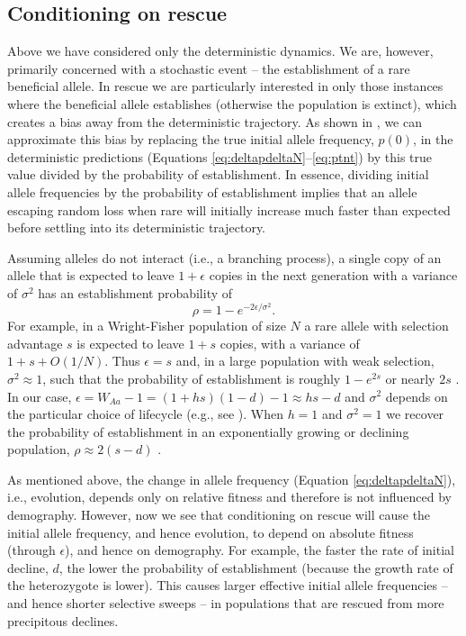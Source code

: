 \documentclass[]{article}
\begin{document}
\subsection*{Conditioning on rescue}
\label{sec:rescue_conditioning}
 
Above we have considered only the deterministic dynamics. 
We are, however, primarily concerned with a stochastic event -- the establishment of a rare beneficial allele.
In rescue we are particularly interested in only those instances where the beneficial allele establishes (otherwise the population is extinct), which creates a bias away from the deterministic trajectory.
As shown in \cite{smith1971use} \citep[see][for an application to evolutionary rescue]{orr2014population}, we can approximate this bias by replacing the true initial allele frequency, $p(0)$, in the deterministic predictions (Equations \ref{eq:deltapdeltaN}--\ref{eq:ptnt}) by this true value divided by the probability of establishment.
In essence, dividing initial allele frequencies by the probability of establishment implies that an allele escaping random loss when rare will initially increase much faster than expected before settling into its deterministic trajectory.

Assuming alleles do not interact (i.e., a branching process), a single copy of an allele that is expected to leave $1+\epsilon$ copies in the next generation with a variance of $\sigma^2$ has an establishment probability of \citep[][p.\ 172, see also \citealp{feller1951diffusion}, equation 5.7]{allen2010introduction}
\begin{equation}\label{eq:pest}
\rho = 1 - e^{-2 \epsilon/\sigma^2}.
\end{equation}
For example, in a Wright-Fisher population of size $N$ a rare allele with selection advantage $s$ is expected to leave $1+s$ copies, with a variance of $1+s+O(1/N)$.
Thus $\epsilon=s$ and, in a large population with weak selection, $\sigma^2 \approx 1$, such that the probability of establishment is roughly $1-e^{2s}$ \citep[][p.\ 80]{fisher1999genetical} or nearly $2s$ \citep{haldane1927mathematical}. 
In our case, $\epsilon = W_{Aa} - 1 = (1 + h s)(1-d)-1 \approx h s - d$ and $\sigma^2$ depends on the particular choice of lifecycle (e.g., see ).
When $h=1$ and $\sigma^2=1$ we recover the probability of establishment in an exponentially growing or declining population, $\rho \approx 2(s - d)$ \citep{otto1997probability}.

As mentioned above, the change in allele frequency (Equation \ref{eq:deltapdeltaN}), i.e., evolution, depends only on relative fitness and therefore is not influenced by demography.
However, now we see that conditioning on rescue will cause the initial allele frequency, and hence evolution, to depend on absolute fitness (through $\epsilon$), and hence on demography.
For example, the faster the rate of initial decline, $d$, the lower the probability of establishment (because the growth rate of the heterozygote is lower).
This causes larger effective initial allele frequencies -- and hence shorter selective sweeps -- in populations that are rescued from more precipitous declines.
\end{document}
